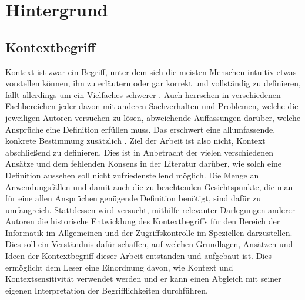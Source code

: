 \chapter{Hintergrund}%
\label{cha:background}


\section{Kontextbegriff}
Kontext ist zwar ein Begriff, unter dem sich die meisten Menschen intuitiv etwas vorstellen können, ihn zu erläutern oder gar korrekt und vollständig zu definieren, fällt allerdings um ein Vielfaches schwerer \cite{dey_understanding_2001}. Auch herrschen in verschiedenen Fachbereichen jeder davon mit anderen Sachverhalten und Problemen, welche die jeweiligen Autoren versuchen zu lösen, abweichende Auffassungen darüber, welche Ansprüche eine Definition erfüllen muss. Das erschwert eine allumfassende, konkrete Bestimmung zusätzlich \cite{hutchison_understanding_2005}. Ziel der Arbeit ist also nicht, Kontext abschließend zu definieren. Dies ist in Anbetracht der vielen verschiedenen Ansätze und dem fehlenden Konsens in der Literatur darüber, wie solch eine Definition aussehen soll \cite{alegre_engineering_2016, wei_liu_survey_2011} nicht zufriedenstellend möglich. Die Menge an Anwendungsfällen und damit auch die zu beachtenden Gesichtspunkte, die man für eine allen Ansprüchen genügende Definition benötigt, sind dafür zu umfangreich. Stattdessen wird versucht, mithilfe relevanter Darlegungen anderer Autoren die historische Entwicklung des Kontextbegriffs für den Bereich der Informatik im Allgemeinen und der Zugriffskontrolle im Speziellen darzustellen. Dies soll ein Verständnis dafür schaffen, auf welchen Grundlagen, Ansätzen und Ideen der Kontextbegriff dieser Arbeit entstanden und aufgebaut ist. Dies ermöglicht dem Leser eine Einordnung davon, wie Kontext und Kontextsensitivität verwendet werden und er kann einen Abgleich mit seiner eigenen Interpretation der Begrifflichkeiten durchführen.
